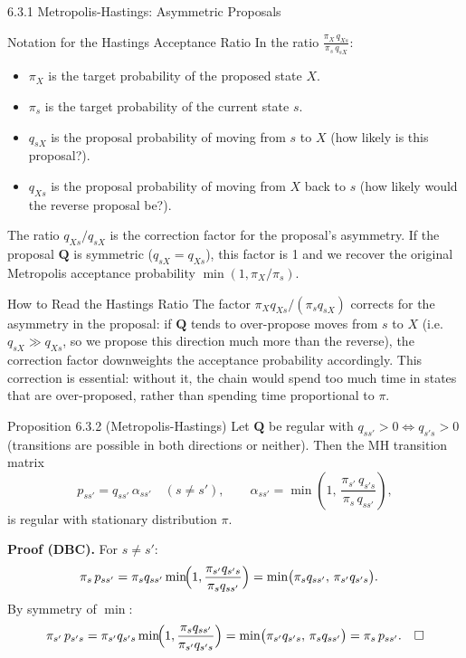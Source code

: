 \documentclass[aspectratio=169,10pt]{beamer}
\newcommand{\bfQ}{\mathbf{Q}}
\begin{document}
\begin{frame}[allowframebreaks]{6.3.1 Metropolis-Hastings: Asymmetric Proposals}
\begin{block}{Notation for the Hastings Acceptance Ratio}
In the ratio $\frac{\pi_X \, q_{Xs}}{\pi_s \, q_{sX}}$:
\begin{itemize}
  \item $\pi_X$ is the target probability of the proposed state $X$.
  \item $\pi_s$ is the target probability of the current state $s$.
  \item $q_{sX}$ is the proposal probability of moving from $s$ to $X$ (how likely is this proposal?).
  \item $q_{Xs}$ is the proposal probability of moving from $X$ back to $s$ (how likely would the reverse proposal be?).
\end{itemize}
The ratio $q_{Xs}/q_{sX}$ is the correction factor for the proposal's asymmetry.
If the proposal $\bfQ$ is symmetric ($q_{sX} = q_{Xs}$), this factor is 1 and we recover the original Metropolis acceptance probability $\min(1, \pi_X/\pi_s)$.
\end{block}

\begin{alertblock}{How to Read the Hastings Ratio}
The factor $\pi_X q_{Xs} / (\pi_s q_{sX})$ corrects for the asymmetry in the proposal: if $\bfQ$ tends to over-propose moves from $s$ to $X$ (i.e.\ $q_{sX} \gg q_{Xs}$, so we propose this direction much more than the reverse), the correction factor downweights the acceptance probability accordingly.
This correction is essential: without it, the chain would spend too much time in states that are over-proposed, rather than spending time proportional to $\pi$.
\end{alertblock}

\framebreak

\begin{block}{Proposition 6.3.2 (Metropolis-Hastings)}
Let $\bfQ$ be regular with $q_{ss'} > 0 \Leftrightarrow q_{s's} > 0$ (transitions are possible in both directions or neither). Then the MH transition matrix
\[
  p_{ss'} = q_{ss'}\, \alpha_{ss'} \quad (s \neq s'), \qquad \alpha_{ss'} = \min\!\left(1,\, \frac{\pi_{s'}\,q_{s's}}{\pi_s\,q_{ss'}}\right),
\]
is regular with stationary distribution $\pi$.
\end{block}

\textbf{Proof (DBC).} For $s \neq s'$:
\begin{align*}
  \pi_s \, p_{ss'} &= \pi_s q_{ss'} \min\!\Bigl(1, \frac{\pi_{s'}q_{s's}}{\pi_s q_{ss'}}\Bigr) = \min\bigl(\pi_s q_{ss'},\, \pi_{s'} q_{s's}\bigr).
\end{align*}
By symmetry of $\min$:
\[
  \pi_{s'} \, p_{s's} = \pi_{s'} q_{s's} \min\!\Bigl(1, \frac{\pi_s q_{ss'}}{\pi_{s'} q_{s's}}\Bigr) = \min\bigl(\pi_{s'} q_{s's},\, \pi_s q_{ss'}\bigr) = \pi_s \, p_{ss'}. \quad \square
\]


\end{frame}
\end{document}

